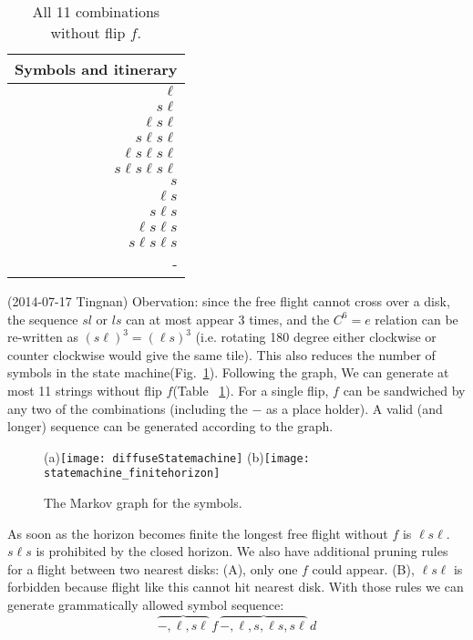 \begin{table}
\begin{center}
\begin{tabular}{r}
Symbols and itinerary \\\hline
$\ell$  \\
$s\ell$ \\
$\ell s \ell$ \\
$s \ell s \ell$ \\
$\ell s \ell s \ell$ \\
$s\ell s \ell s \ell$ \\
$s$  \\
$\ell s$ \\
$s \ell s $ \\
$\ell s \ell s$ \\
$s \ell s \ell s$ \\
- \\\hline
\end{tabular}
\end{center}
\caption{All 11 combinations without flip $f$. }
\label{tab:11slcombos}
\end{table}
(2014-07-17 Tingnan) Obervation: since the free flight cannot cross over a disk, the sequence $sl$ or $ls$ can at most appear 3 times, and the $C^6=e$ relation can be re-written as $(s\ell)^3=(\ell s)^3$ (i.e. rotating 180 degree either clockwise or counter clockwise would give the same tile). This also reduces the number of symbols in the state machine(Fig.~\ref{fig:statemachine}). Following the graph, We can generate at most 11 strings without flip $f$(Table ~\ref{tab:11slcombos}). For a single flip, $f$ can be sandwiched by
any two of the combinations (including the $-$ as a place holder). A valid (and longer) sequence can be generated according to the graph.
\begin{figure}
(a)\texttt{[image: diffuseStatemachine]}
(b)\texttt{[image: statemachine\_finitehorizon]}
\caption{\label{fig:statemachine} The Markov graph for the symbols.
}
\end{figure}

As soon as the horizon becomes finite the longest free flight without $f$
is $\ell s \ell$. $s \ell s$ is prohibited by the closed horizon. We also
have additional pruning rules for a flight between two nearest disks:
(A), only one $f$ could appear. (B), $ \ell s \ell $ is forbidden because
flight like this cannot hit nearest disk. With those rules we can
generate grammatically allowed symbol sequence:
\[
\overbrace{-,\ell,s\ell}\, f\,\overbrace{-,\ell,s,\ell s, s\ell}\, d
\]

